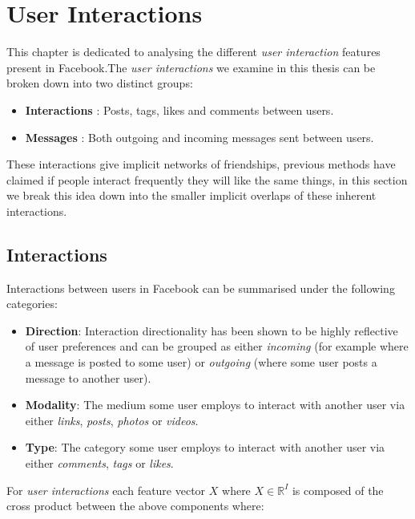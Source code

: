 
\chapter{User Interactions}
\label{cha:interactions}

This chapter is dedicated to analysing the different \emph{user interaction} features present in Facebook.The \emph{user interactions} we examine in this thesis can be broken down into two distinct groups:
\begin{itemize}
\item \textbf{Interactions} : Posts, tags, likes and comments between users.
\item \textbf{Messages} : Both outgoing and incoming messages sent between users.
\end{itemize}

These interactions give implicit networks of friendships, previous methods \cite{www} have claimed if people interact frequently 
they will like the same things, in this section we break this idea down into the smaller implicit overlaps of these inherent interactions.

\section{Interactions}
\label{sec:inter}

Interactions between users in Facebook can be summarised under the following categories:

\begin{itemize}
\item \textbf{Direction}: Interaction directionality has been shown to be highly 
reflective of user preferences \cite{saez2011high} and can be grouped as either \emph{incoming} (for example where a message is posted to some user) or 
\emph{outgoing} (where some user posts a message to another user). 
\item \textbf{Modality}: The medium some user employs to interact with another user via either \emph{links}, \emph{posts}, \emph{photos} or \emph{videos}.
\item \textbf{Type}: The category some user employs to interact with another user via either \emph{comments}, \emph{tags} or \emph{likes}.
\end{itemize}

For \emph{user interactions} each feature vector $X$ where $X \in \mathbb{R}^I$ is composed of the cross product between the above components where:

